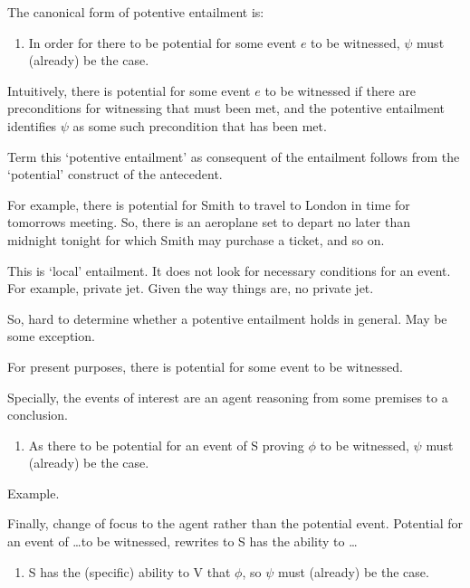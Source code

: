 \begin{note}
  The canonical form of potentive entailment is:
  \begin{enumerate}
  \item In order for there to be potential for some event \(e\) to be witnessed, \(\psi\) must (already) be the case.
  \end{enumerate}
  Intuitively, there is potential for some event \(e\) to be witnessed if there are preconditions for witnessing that must been met, and the potentive entailment identifies \(\psi\) as some such precondition that has been met.

  Term this `potentive entailment' as consequent of the entailment follows from the `potential' construct of the antecedent.
  
  For example, there is potential for Smith to travel to London in time for tomorrows meeting.
  So, there is an aeroplane set to depart no later than midnight tonight for which Smith may purchase a ticket, and so on.
  
  This is `local' entailment.
  It does not look for necessary conditions for an event.
  For example, private jet.
  Given the way things are, no private jet.

  So, hard to determine whether a potentive entailment holds in general.
  May be some exception.

  For present purposes, there is potential for some event to be witnessed.

  Specially, the events of interest are an agent reasoning from some premises to a conclusion.

  \begin{enumerate}
  \item\label{PE:ability:event} As there to be potential for an event of S proving \(\phi\) to be witnessed, \(\psi\) must (already) be the case.
  \end{enumerate}

  Example.

  Finally, change of focus to the agent rather than the potential event.
  Potential for an event of \dots to be witnessed, rewrites to S has the ability to \dots

  \begin{enumerate}
  \item\label{PE:ability:agent} S has the (specific) ability to V that \(\phi\), so \(\psi\) must (already) be the case.
  \end{enumerate}


\end{note}
